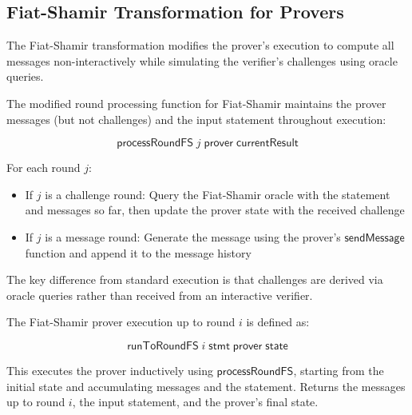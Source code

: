 \subsection{Fiat-Shamir Transformation for Provers}\label{sec:fiat_shamir_prover}

The Fiat-Shamir transformation modifies the prover's execution to compute all messages non-interactively while simulating the verifier's challenges using oracle queries.

\begin{definition}
    \label{def:prover_process_round_fs}
    The modified round processing function for Fiat-Shamir maintains the prover messages (but not challenges) and the input statement throughout execution:

    \[ \mathsf{processRoundFS} \;j \;\mathsf{prover} \;\mathsf{currentResult} \]

    For each round $j$:
    \begin{itemize}
        \item If $j$ is a challenge round: Query the Fiat-Shamir oracle with the statement and messages so far, then update the prover state with the received challenge
        \item If $j$ is a message round: Generate the message using the prover's $\mathsf{sendMessage}$ function and append it to the message history
    \end{itemize}

    The key difference from standard execution is that challenges are derived via oracle queries rather than received from an interactive verifier.
\end{definition}

\begin{definition}
    \label{def:prover_run_to_round_fs}
    The Fiat-Shamir prover execution up to round $i$ is defined as:

    \[ \mathsf{runToRoundFS} \;i \;\mathsf{stmt} \;\mathsf{prover} \;\mathsf{state} \]

    This executes the prover inductively using $\mathsf{processRoundFS}$, starting from the initial state and accumulating messages and the statement. Returns the messages up to round $i$, the input statement, and the prover's final state.
\end{definition}

